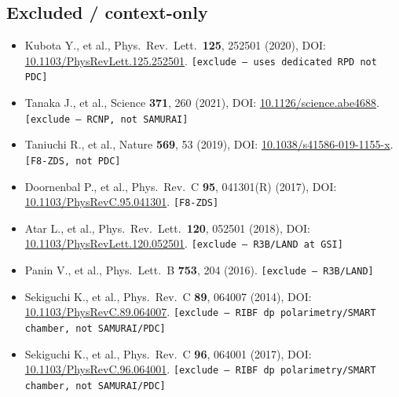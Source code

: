 \documentclass[a4paper, 11pt]{article}
\begin{document}
\subsection{Excluded / context-only}
\begin{itemize}
  \item Kubota Y., et al., Phys.\ Rev.\ Lett.\ \textbf{125}, 252501 (2020), DOI: \href{https://doi.org/10.1103/PhysRevLett.125.252501}{10.1103/PhysRevLett.125.252501}. \texttt{[exclude --- uses dedicated RPD not PDC]}
  \item Tanaka J., et al., Science \textbf{371}, 260 (2021), DOI: \href{https://doi.org/10.1126/science.abe4688}{10.1126/science.abe4688}. \texttt{[exclude --- RCNP, not SAMURAI]}
  \item Taniuchi R., et al., Nature \textbf{569}, 53 (2019), DOI: \href{https://doi.org/10.1038/s41586-019-1155-x}{10.1038/s41586-019-1155-x}. \texttt{[F8-ZDS, not PDC]}
  \item Doornenbal P., et al., Phys.\ Rev.\ C \textbf{95}, 041301(R) (2017), DOI: \href{https://doi.org/10.1103/PhysRevC.95.041301}{10.1103/PhysRevC.95.041301}. \texttt{[F8-ZDS]}
  \item Atar L., et al., Phys.\ Rev.\ Lett.\ \textbf{120}, 052501 (2018), DOI: \href{https://doi.org/10.1103/PhysRevLett.120.052501}{10.1103/PhysRevLett.120.052501}. \texttt{[exclude --- R3B/LAND at GSI]}
  \item Panin V., et al., Phys.\ Lett.\ B \textbf{753}, 204 (2016). \texttt{[exclude --- R3B/LAND]}
  \item Sekiguchi K., et al., Phys.\ Rev.\ C \textbf{89}, 064007 (2014), DOI: \href{https://doi.org/10.1103/PhysRevC.89.064007}{10.1103/PhysRevC.89.064007}. \texttt{[exclude --- RIBF dp polarimetry/SMART chamber, not SAMURAI/PDC]}
  \item Sekiguchi K., et al., Phys.\ Rev.\ C \textbf{96}, 064001 (2017), DOI: \href{https://doi.org/10.1103/PhysRevC.96.064001}{10.1103/PhysRevC.96.064001}. \texttt{[exclude --- RIBF dp polarimetry/SMART chamber, not SAMURAI/PDC]}
\end{itemize}
\end{document}

